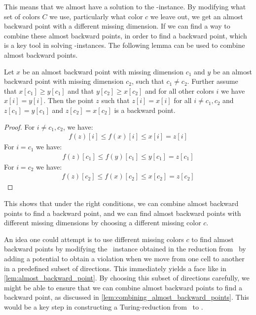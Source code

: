 This means that we almost have a solution to the \Tarskistar-instance. By modifying what set of colors $C$ we use, particularly what color $c$ we leave out, we get an almost backward point with a different missing dimension. If we can find a way to combine these almost backward points, in order to find a backward point, which is a key tool in solving \Tarski-instances. The following lemma can be used to combine almost backward points.

\begin{lemma}\label{lem:combining_almost_backward_points}
	Let $x$ be an almost backward point with missing dimension $c_1$ and $y$ be an almost backward point with missing dimension $c_2$, such that $c_1 \neq c_2$. Further assume that $x[c_1] \geq y[c_1]$ and that $y[c_2] \geq x[c_2]$ and for all other colors $i$ we have $x[i]=y[i]$. Then the point $z$ such that $z[i] = x[i]$ for all $i \neq c_1, c_2$ and $z[c_1] = y[c_1]$ and $z[c_2] = x[c_2]$ is a backward point.
\end{lemma}
\begin{proof}
	For $i \neq c_1, c_2$, we have:
	\begin{align*}
		f(z)[i] \leq f(x)[i] \leq x[i] = z[i]
	\end{align*}
	For $i = c_1$ we have:
	\begin{align*}
		f(z)[c_1] \leq f(y)[c_1] \leq y[c_1] = z[c_1]
	\end{align*}
	For $i = c_2$ we have:
	\begin{align*}
		f(z)[c_2] \leq f(x)[c_2] \leq x[c_2] = z[c_2]
	\end{align*}
\end{proof}
This shows that under the right conditions, we can combine almost backward points to find a backward point, and we can find almost backward points with different missing dimensions by choosing a different missing color $c$.

An idea one could attempt is to use different missing colors $c$ to find almost backward points by modifying the \EndOfLine\ instance obtained in the reduction from \Tarskistar\ by adding a potential to obtain a violation when we move from one cell to another in a predefined subset of directions. This immediately yields a face like in \cref{lem:almost_backward_point}. By choosing this subset of directions carefully, we might be able to ensure that we can combine almost backward points to find a backward point, as discussed in \cref{lem:combining_almost_backward_points}. This would be a key step in constructing a Turing-reduction from \Tarskistar\ to \EndOfPotentialLine\@.

